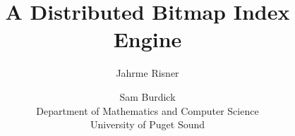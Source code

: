 \documentclass[letterpaper,10pt]{article}
\title{A Distributed Bitmap Index Engine}
\author{
    {Jahrme Risner}\and{Sam Burdick}\\
    Department of Mathematics and Computer Science\\
    University of Puget Sound
}
\begin{document}
\maketitle









\nocite{*} %

\end{document}

